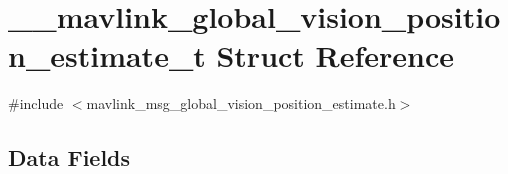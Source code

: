 \hypertarget{struct____mavlink__global__vision__position__estimate__t}{\section{\-\_\-\-\_\-mavlink\-\_\-global\-\_\-vision\-\_\-position\-\_\-estimate\-\_\-t Struct Reference}
\label{struct____mavlink__global__vision__position__estimate__t}
}


{\ttfamily \#include $<$mavlink\-\_\-msg\-\_\-global\-\_\-vision\-\_\-position\-\_\-estimate.\-h$>$}

\subsection*{Data Fields}
